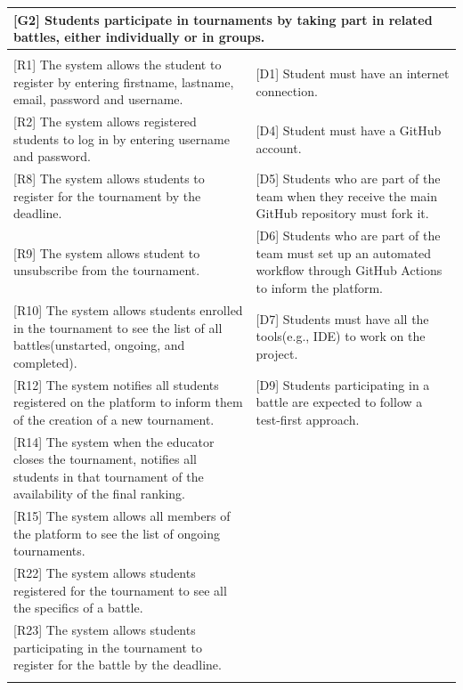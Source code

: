 \begin{tabular}{|p{7.5cm}|p{7.5cm}|}
\hline
\multicolumn{2}{|p{15cm}|}{\textbf{[G2] Students participate in tournaments by taking part in related battles, either individually or in groups.}}\\
\hline
\vspace{2pt}&\vspace{2pt}\\
{[R1] The system allows the student to register by entering firstname, lastname, email, password and username.}  
& 
{[D1] Student must have an internet connection.}
\\

{[R2] The system allows registered students to log in by entering username and password.}
&
{[D4] Student must have a GitHub account.}
\\

{[R8] The system allows students to register for the tournament by the deadline.}
&
{[D5] Students who are part of the team when they receive the main GitHub repository must fork it.}
\\

{[R9] The system allows student to unsubscribe from the tournament.}
&
{[D6] Students who are part of the team must set up an automated workflow through GitHub Actions to inform the platform.}
\\

{[R10] The system allows students enrolled in the tournament to see the list of all battles(unstarted, ongoing, and completed).}
&
{[D7] Students must have all the tools(e.g., IDE) to work on the project.}
\\

{[R12] The system notifies all students registered on the platform to inform them of the creation of a new tournament.}
&
{[D9] Students participating in a battle are expected to follow a test-first approach.}
\\

{[R14] The system when the educator closes the tournament, notifies all students in that tournament of the availability of the final ranking.}
&
\\

{[R15] The system allows all members of the platform to see the list of ongoing tournaments.}
& \\

{[R22] The system allows students registered for the tournament to see all the specifics of a battle.}
& \\

{[R23] The system allows students participating in the tournament to register for the battle by the deadline.}
& \\

\vspace{2pt}&\vspace{2pt}\\
\hline
\end{tabular}
